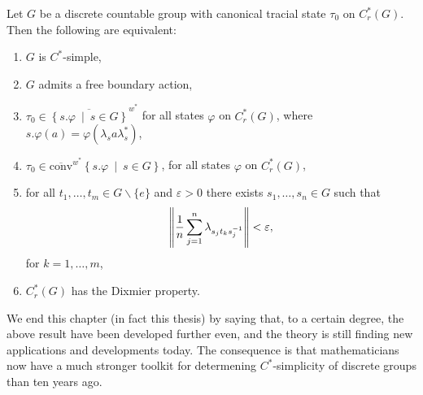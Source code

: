 \begin{theorem}
	Let $G$ be a discrete countable group with canonical tracial state $\tau_0$ on $C_r^*(G)$. Then the following are equivalent:
	\begin{enumerate}
		\item $G$ is $C^*$-simple,
		\item $G$ admits a free boundary action,
		\item $\tau_0 \in\overline{ \left\{ s.\varphi \ \mid \ s \in G \right\}}^{w^*}$ for all states $\varphi $ on $C_r^*(G)$, where $s.\varphi(a) = \varphi(\lambda_s a \lambda_s^*)$,
		\item $\tau_0 \in \overline{\mathrm{conv}}^{w^*}\left\{ s . \varphi \ \mid \ s \in G \right\}$, for all states $\varphi$ on $C_r^*(G)$,
		\item for all $t_1,\dots,t_m \in G\backslash\{e\}$ and $\varepsilon > 0$ there exists $s_1,\dots,s_n \in G$ such that
			\begin{align*}
				\left\lVert \frac1n \sum_{j=1}^n \lambda_{s_jt_ks_j^{-1}}\right\rVert < \varepsilon,
			\end{align*}
			for $k=1,\dots,m$,
		\item $C_r^*(G)$ has the Dixmier property.
	\end{enumerate}
	\label{uffecsimple}
\end{theorem}
We end this chapter (in fact this thesis) by saying that, to a certain degree, the above result have been developed further even, and the theory is still finding new applications and developments today. The consequence is that mathematicians now have a much stronger toolkit for determening $C^*$-simplicity of discrete groups than ten years ago.

